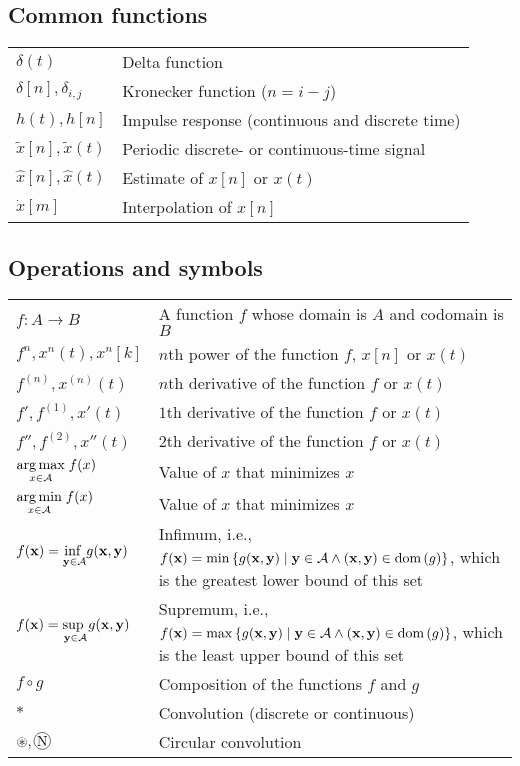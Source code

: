 \documentclass{article}
\newcommand*\circconv[1]{%
\tikz[baseline=(C.base)]\node[draw,circle,inner sep=0.5pt](C) {#1};\!
}
\newcommand{\dom}[1]{\ensuremath{\textnormal{dom}\left(#1\right)}} %
\begin{document}
\subsection{Common functions}
\begin{xltabular}{\textwidth}{XX}
    \(\delta(t)\) & Delta function\\
    \(\delta[n], \delta_{i,j}\) & Kronecker function (\(n = i-j\))\\
    \(h(t), h[n]\) & Impulse response (continuous and discrete time)\\
    \(\tilde{x}[n], \tilde{x}(t)\) & Periodic discrete- or continuous-time signal\\
    \(\hat{x}[n], \hat{x}(t)\) & Estimate of \(x[n]\) or \(x(t)\)\\
    \(\dot{x}[m]\) & Interpolation of \(x[n]\)\\
\end{xltabular}
\subsection{Operations and symbols}
\begin{xltabular}{\textwidth}{XX}
    \(f: A \rightarrow B\)& A function \(f\) whose domain is \(A\) and codomain is \(B\)\\
    \(f^{n}, x^{n}(t), x^{n}[k]\) & \(n\)th power of the function \(f\), \(x[n]\) or \(x(t)\)\\
    \(f^{\left( n \right)},  x^{(n)}(t)\) & \(n\)th derivative of the function \(f\) or \(x(t)\)\\
    \(f', f^{\left( 1 \right)}, x'(t)\) & \(1\)th derivative of the function \(f\) or \(x(t)\)\\
    \(f'', f^{\left( 2 \right)}, x''(t)\) & \(2\)th derivative of the function \(f\) or \(x(t)\)\\
    \(\argmax[x \in \mathcal{A}]{f(x)} \) & Value of \(x\) that minimizes \(x\)\\
    \( \argmin[x \in \mathcal{A}]{f(x)} \) & Value of \(x\) that minimizes \(x\)\\
    \(f(\mathbf{x}) = \underset{\mathbf{y} \in \mathcal{A}}{\textnormal{inf }} g(\mathbf{x},\mathbf{y})\) & Infimum, i.e., \(f(\mathbf{x}) = \min{\left\{ g(\mathbf{x}, \mathbf{y}) \mid \mathbf{y} \in \mathcal{A} \wedge \left( \mathbf{x}, \mathbf{y} \right) \in \dom{g} \right\}}\), which is the greatest lower bound of this set \cite{boydConvexOptimization2004}\\
    \(f(\mathbf{x}) = \underset{\mathbf{y} \in \mathcal{A}}{\textnormal{sup }} g(\mathbf{x},\mathbf{y})\) & Supremum, i.e., \(f(\mathbf{x}) = \max{\left\{ g(\mathbf{x}, \mathbf{y}) \mid \mathbf{y} \in \mathcal{A} \wedge \left( \mathbf{x}, \mathbf{y} \right) \in \dom{g} \right\}}\), which is the least upper bound of this set \cite{boydConvexOptimization2004}\\
    \(f \circ g\) & Composition of the functions \(f\) and \(g\)\\
    \(*\) & Convolution (discrete or continuous)\\
    \(\circledast, \circconv{N}\) & Circular convolution \cite{oppenheimDiscreteTimeSignalProcessing2009,dinizDigitalSignalProcessing2010}\\
\end{xltabular}
\end{document}
